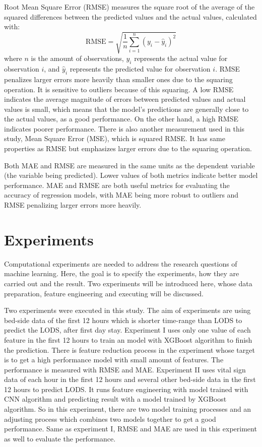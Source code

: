 \documentclass[12pt,a4paper,english
]{tunithesis}
\begin{document}
Root Mean Square Error (RMSE) measures the square root of the average of the squared differences between the predicted values and the actual values, calculated with: 
\begin{equation*}
    \mathrm{RMSE}=\sqrt{\frac{1}{n} \sum_{i=1}^n\left(y_i-\hat{y}_i\right)^2}
\end{equation*}
where $n$ is the amount of observations, $y_i$ represents the actual value for observation $i$, and $\hat{y}_i$ represents the predicted value for observation $i$. RMSE penalizes larger errors more heavily than smaller ones due to the squaring operation. It is sensitive to outliers because of this squaring. A low RMSE indicates the average magnitude of errors between predicted values and actual values is small, which means that the model's predictions are generally close to the actual values, as a good performance. On the other hand, a high RMSE indicates poorer performance. There is also another measurement used in this study, Mean Square Error (MSE), which is squared RMSE. It has same properties as RMSE but emphasizes larger errors due to the squaring operation.

Both MAE and RMSE are measured in the same units as the dependent variable (the variable being predicted). Lower values of both metrics indicate better model performance. MAE and RMSE are both useful metrics for evaluating the accuracy of regression models, with MAE being more robust to outliers and RMSE penalizing larger errors more heavily.


\chapter{Experiments}
\label{ch:experiment}
Computational experiments are needed to address the research questions of machine learning. Here, the goal is to specify the experiments, how they are carried out and the result. Two experiments will be introduced here, whose data preparation, feature engineering and executing will be discussed.

Two experiments were executed in this study. The aim of experiments are using bed-side data of the first 12 hours which is shorter time-range than LODS to predict the LODS, after first day stay. Experiment I uses only one value of each feature in the first 12 hours to train an model with XGBoost algorithm to finish the prediction. There is feature reduction process in the experiment whose target is to get a high performance model with small amount of features. The performance is measured with RMSE and MAE.
Experiment II uses vital sign data of each hour in the first 12 hours and several other bed-side data in the first 12 hours to predict LODS. It runs feature engineering with model trained with CNN algorithm and predicting result with a model trained by XGBoost algorithm. So in this experiment, there are two model training processes and an adjusting process which combines two models together to get a good performance. Same as experiment I, RMSE and MAE are used in this experiment as well to evaluate the performance.
\end{document}
